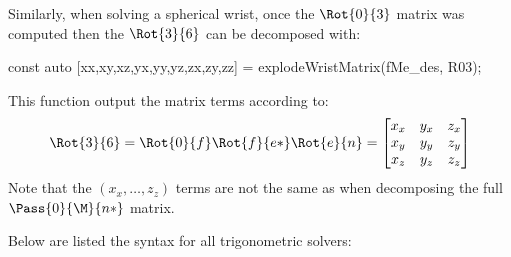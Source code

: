 \documentclass{ecnreport}
\begin{document}
Similarly, when solving a spherical wrist, once the $\Rot{0}{3}$ matrix was computed then the $\Rot{3}{6}$ can be decomposed with:
\begin{cppcode}
    const auto [xx,xy,xz,yx,yy,yz,zx,zy,zz] = explodeWristMatrix(fMe_des, R03);
\end{cppcode}
This function output the matrix terms according to:
\begin{equation*}
\Rot{3}{6} = \Rot{0}{f}\Rot{f}{e*}\Rot{e}{n} = \left[\begin{matrix}x_x & y_x & z_x\\x_y & y_y & z_y\\x_z & y_z & z_z\end{matrix}\right]
\end{equation*}
Note that the $(x_x, \hdots, z_z)$ terms are not the same as when decomposing the full $\Pass{0}{\M}{n*}$ matrix.

  \newpage
  Below are listed the syntax for all trigonometric solvers:\\
\end{document}
